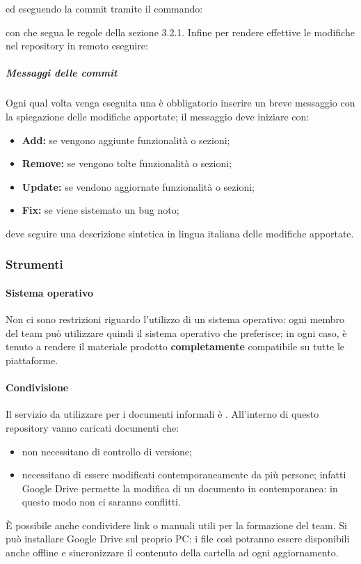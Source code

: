 		\begin{center}
		\end{center}
		ed eseguendo la commit tramite il commando:
		\begin{center}
		\end{center}
		con  che segua le regole della sezione 3.2.1.
		Infine per rendere effettive le modifiche nel repository in remoto eseguire:
		\begin{center}
		\end{center}
		\subparagraph{Messaggi delle commit}
		Ogni qual volta venga eseguita una  è obbligatorio inserire un breve messaggio con la spiegazione
		delle modifiche apportate; il messaggio deve iniziare con:
		\begin{itemize}
			\item \textbf{Add:} se vengono aggiunte funzionalità o sezioni;
			\item \textbf{Remove:} se vengono tolte funzionalità o sezioni;
			\item \textbf{Update:} se vendono aggiornate funzionalità o sezioni;
			\item \textbf{Fix:} se viene sistemato un bug noto;
		\end{itemize}
		deve seguire una descrizione sintetica in lingua italiana delle modifiche apportate.
\subsubsection{Strumenti}
	\paragraph{Sistema operativo}
	Non ci sono restrizioni riguardo l'utilizzo di un sistema operativo: ogni membro del team può utilizzare quindi il sistema operativo che preferisce; in ogni caso, è tenuto a rendere il materiale prodotto \textbf{completamente} compatibile su tutte le piattaforme.
	\paragraph{Condivisione}
	Il servizio da utilizzare per i documenti informali è .
	All'interno di questo repository vanno caricati documenti che:
	\begin{itemize}
		\item non necessitano di controllo di versione;
		\item necessitano di essere modificati contemporaneamente da più persone; infatti Google Drive permette la modifica di un documento in contemporanea: in questo modo non ci saranno conflitti.
	\end{itemize}
	È possibile anche condividere link o manuali utili per la formazione del team. Si può installare Google Drive sul proprio PC: i file così potranno essere disponibili anche offline e sincronizzare il contenuto della cartella ad ogni aggiornamento.

